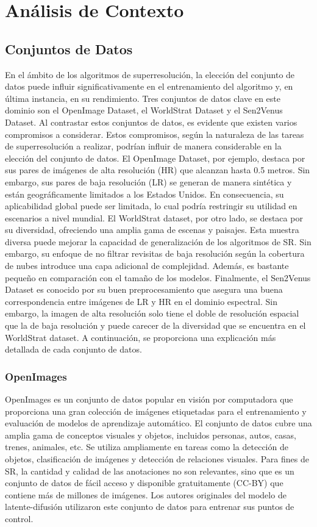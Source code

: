 \chapter{Análisis de Contexto}

\section{Conjuntos de Datos}
\label{chapter:datasets}
En el ámbito de los algoritmos de superresolución, la elección del conjunto de datos puede influir significativamente en el entrenamiento del algoritmo y, en última instancia, en su rendimiento. Tres conjuntos de datos clave en este dominio son el OpenImage Dataset, el WorldStrat Dataset y el Sen2Venus Dataset. Al contrastar estos conjuntos de datos, es evidente que existen varios compromisos a considerar. Estos compromisos, según la naturaleza de las tareas de superresolución a realizar, podrían influir de manera considerable en la elección del conjunto de datos. El OpenImage Dataset, por ejemplo, destaca por sus pares de imágenes de alta resolución (HR) que alcanzan hasta 0.5 metros. Sin embargo, sus pares de baja resolución (LR) se generan de manera sintética y están geográficamente limitados a los Estados Unidos. En consecuencia, su aplicabilidad global puede ser limitada, lo cual podría restringir su utilidad en escenarios a nivel mundial. El WorldStrat dataset, por otro lado, se destaca por su diversidad, ofreciendo una amplia gama de escenas y paisajes. Esta muestra diversa puede mejorar la capacidad de generalización de los algoritmos de SR. Sin embargo, su enfoque de no filtrar revisitas de baja resolución según la cobertura de nubes introduce una capa adicional de complejidad. Además, es bastante pequeño en comparación con el tamaño de los modelos. Finalmente, el Sen2Venus Dataset es conocido por su buen preprocesamiento que asegura una buena correspondencia entre imágenes de LR y HR en el dominio espectral. Sin embargo, la imagen de alta resolución solo tiene el doble de resolución espacial que la de baja resolución y puede carecer de la diversidad que se encuentra en el WorldStrat dataset. A continuación, se proporciona una explicación más detallada de cada conjunto de datos.

\subsection{OpenImages}
OpenImages es un conjunto de datos popular en visión por computadora que proporciona una gran colección de imágenes etiquetadas para el entrenamiento y evaluación de modelos de aprendizaje automático. El conjunto de datos cubre una amplia gama de conceptos visuales y objetos, incluidos personas, autos, casas, trenes, animales, etc. Se utiliza ampliamente en tareas como la detección de objetos, clasificación de imágenes y detección de relaciones visuales. Para fines de SR, la cantidad y calidad de las anotaciones no son relevantes, sino que es un conjunto de datos de fácil acceso y disponible gratuitamente (CC-BY) que contiene más de millones de imágenes. Los autores originales del modelo de latente-difusión utilizaron este conjunto de datos para entrenar sus puntos de control.

